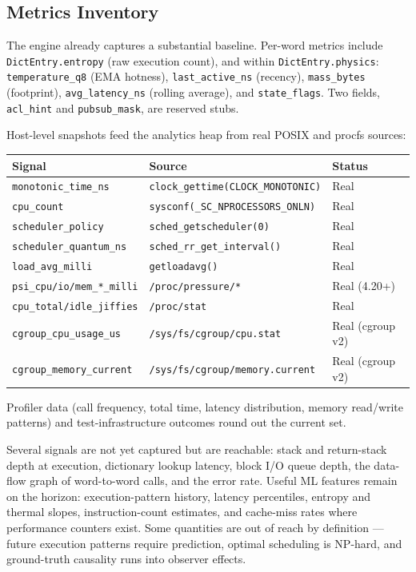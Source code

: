 \subsection{Metrics Inventory}

The engine already captures a substantial baseline. Per-word metrics include
\texttt{DictEntry.entropy} (raw execution count), and within
\texttt{DictEntry.physics}: \texttt{temperature\_q8} (EMA hotness),
\texttt{last\_active\_ns} (recency), \texttt{mass\_bytes} (footprint),
\texttt{avg\_latency\_ns} (rolling average), and \texttt{state\_flags}. Two fields,
\texttt{acl\_hint} and \texttt{pubsub\_mask}, are reserved stubs.

Host-level snapshots feed the analytics heap from real POSIX and procfs sources:

\begin{center}
\begin{tabular}{lll}
\toprule
Signal & Source & Status \\
\midrule
\texttt{monotonic\_time\_ns} & \texttt{clock\_gettime(CLOCK\_MONOTONIC)} & Real \\
\texttt{cpu\_count} & \texttt{sysconf(\_SC\_NPROCESSORS\_ONLN)} & Real \\
\texttt{scheduler\_policy} & \texttt{sched\_getscheduler(0)} & Real \\
\texttt{scheduler\_quantum\_ns} & \texttt{sched\_rr\_get\_interval()} & Real \\
\texttt{load\_avg\_milli} & \texttt{getloadavg()} & Real \\
\texttt{psi\_cpu/io/mem\_*\_milli} & \texttt{/proc/pressure/*} & Real (4.20+) \\
\texttt{cpu\_total/idle\_jiffies} & \texttt{/proc/stat} & Real \\
\texttt{cgroup\_cpu\_usage\_us} & \texttt{/sys/fs/cgroup/cpu.stat} & Real (cgroup v2) \\
\texttt{cgroup\_memory\_current} & \texttt{/sys/fs/cgroup/memory.current} & Real (cgroup v2) \\
\bottomrule
\end{tabular}
\end{center}

Profiler data (call frequency, total time, latency distribution, memory
read/write patterns) and test-infrastructure outcomes round out the current set.

Several signals are not yet captured but are reachable: stack and return-stack
depth at execution, dictionary lookup latency, block I/O queue depth, the data-flow
graph of word-to-word calls, and the error rate. Useful ML features remain on the
horizon: execution-pattern history, latency percentiles, entropy and thermal
slopes, instruction-count estimates, and cache-miss rates where performance
counters exist. Some quantities are out of reach by definition --- future execution
patterns require prediction, optimal scheduling is NP-hard, and ground-truth
causality runs into observer effects.

